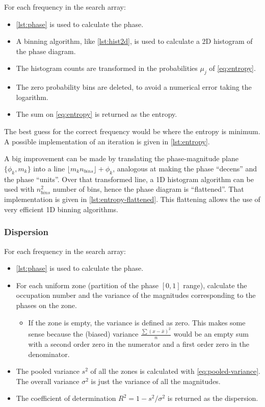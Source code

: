 For each frequency in the search array:

\begin{itemize}
	\item \autoref{lst:phase} is used to calculate the phase.
	\item A binning algorithm, like \autoref{lst:hist2d}, is used to calculate a 2D histogram of the phase diagram.
	\item The histogram counts are transformed in the probabilities $\mu_j$ of \autoref{eq:entropy}.
	\item The zero probability bins are deleted, to avoid a numerical error taking the logarithm.
	\item The sum on \autoref{eq:entropy} is returned as the entropy.
\end{itemize}

The best guess for the correct frequency would be where the entropy is minimum.
A possible implementation of an iteration is given in \autoref{lst:entropy}.

A big improvement can be made by translating the phase-magnitude plane $\{\phi_k,m_k\}$ into a line $\lfloor m_k n_{bins} \rfloor + \phi_k$,
analogous at making the phase \enquote{decens} and the phase \enquote{units}.
Over that transformed line, a 1D histogram algorithm can be used with $n_{bins}^2$ number of bins, hence the phase diagram is \enquote{flattened}. 
That implementation is given in \autoref{lst:entropy-flattened}. 
This flattening allows the use of very efficient 1D binning algorithms.

\subsubsection{Dispersion}

For each frequency in the search array:
\begin{itemize}
	\item \autoref{lst:phase} is used to calculate the phase.
	\item For each uniform zone (partition of the phase $[0,1]$ range), 
	calculate the occupation number and the variance of the magnitudes corresponding to the phases on the zone.
	\begin{itemize}
		\item If the zone is empty, the variance is defined as zero. This makes some sense because the (biased) variance 
		$\frac{\sum(x-\bar{x})^2}{n}$ would be an empty sum with a second order zero in the numerator and a first order zero in the denominator.
	\end{itemize}
	\item The pooled variance $s^2$ of all the zones is calculated with \autoref{eq:pooled-variance}. 
	The overall variance $\sigma^2$ is just the variance of all the magnitudes.
	\item The coefficient of determination $R^2=1-s^2/\sigma^2$ is returned as the dispersion.
\end{itemize}

